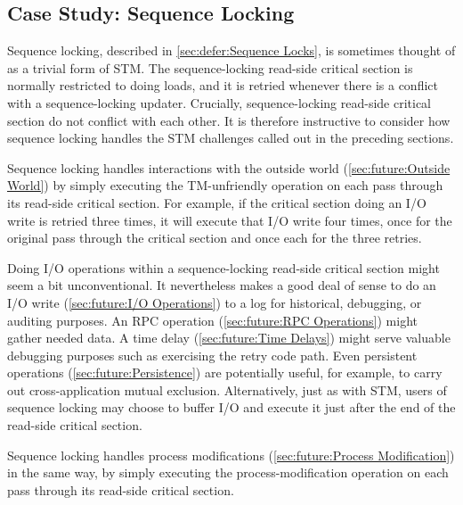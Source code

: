 \subsection{Case Study:
	    Sequence Locking}
\label{sec:future:Case Study: Sequence Locking}

Sequence locking, described in
\cref{sec:defer:Sequence Locks},
is sometimes thought of as a trivial form of STM\@.
The sequence-locking read-side critical section is normally restricted
to doing loads, and it is retried whenever there is a conflict with a
sequence-locking updater.
Crucially, sequence-locking read-side critical section do not conflict
with each other.
It is therefore instructive to consider how sequence locking handles
the STM challenges called out in the preceding sections.

Sequence locking handles interactions with the outside world
(\cref{sec:future:Outside World}) by simply executing the
TM-unfriendly operation on each pass through its read-side
critical section.
For example, if the critical section doing an I/O write
is retried three times, it will execute that I/O write four
times, once for the original pass through the critical
section and once each for the three retries.

Doing I/O operations within a sequence-locking read-side
critical section might seem a bit unconventional.
It nevertheless makes a good deal of sense to do
an I/O write (\cref{sec:future:I/O Operations})
to a log for historical, debugging, or auditing purposes.
An RPC operation (\cref{sec:future:RPC Operations}) might gather needed data.
A time delay (\cref{sec:future:Time Delays}) might serve valuable
debugging purposes such as exercising the retry code path.
Even persistent operations (\cref{sec:future:Persistence}) are potentially
useful, for example, to carry out cross-application mutual exclusion.
Alternatively, just as with STM, users of sequence locking may choose
to buffer I/O and execute it just after the end of the read-side critical
section.

Sequence locking handles process modifications
(\cref{sec:future:Process Modification})
in the same way, by simply executing the process-modification operation
on each pass through its read-side critical section.

